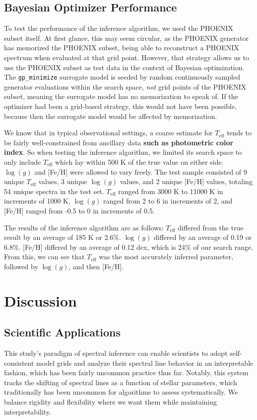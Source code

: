 \documentclass[twocolumn, linenumbers]{aastex631}
\begin{document}
\subsection{Bayesian Optimizer Performance}
To test the performance of the inference algorithm, we used the PHOENIX subset itself.
At first glance, this may seem circular, as the PHOENIX generator has memorized the PHOENIX subset, being able to reconstruct a PHOENIX spectrum when evaluated at that grid point.
However, that strategy allows us to use the PHOENIX subset as test data in the context of Bayesian optimization.
The \texttt{gp\_minimize} surrogate model is seeded by random continuously sampled generator evaluations within the search space, \textit{not} grid points of the PHOENIX subset, meaning the surrogate model has no memorization to speak of.
If the optimizer had been a grid-based strategy, this would not have been possible, because then the surrogate model would be affected by memorization.

We know that in typical observational settings, a coarse estimate for $T_{\mathrm{eff}}$ tends to be fairly well-constrained from ancillary data \textbf{such as photometric color index}.
So when testing the inference algorithm, we limited its search space to only include $T_{\mathrm{eff}}$ which lay within 500 K of the true value on either side.
$\log(g)$ and [Fe/H] were allowed to vary freely.
The test sample consisted of 9 unique $T_{\mathrm{eff}}$ values, 3 unique $\log(g)$ values, and 2 unique [Fe/H] values, totaling 54 unique spectra in the test set.
$T_{\mathrm{eff}}$ ranged from 3000 K to 11000 K in increments of 1000 K, $\log(g)$ ranged from 2 to 6 in increments of 2, and [Fe/H] ranged from -0.5 to 0 in increments of 0.5.

The results of the inference algorithm are as follows: $T_{\mathrm{eff}}$ differed from the true result by an average of 185 K or 2.6\%.
$\log(g)$ differed by an average of 0.19 or 6.8\%. [Fe/H] differed by an average of 0.12 dex, which is 24\% of our search range.
From this, we can see that $T_{\mathrm{eff}}$ was the most accurately inferred parameter, followed by $\log(g)$, and then [Fe/H].

\section{Discussion}
\subsection{Scientific Applications}
This study's paradigm of spectral inference can enable scientists to adopt self-consistent model grids and analyze their spectral line behavior in an interpretable fashion, which has been fairly uncommon practice thus far.
Notably, this system tracks the shifting of spectral lines as a function of stellar parameters, which traditionally has been uncommon for algorithms to assess systematically.
We balance rigidity and flexibility where we want them while maintaining interpretability.
\end{document}
